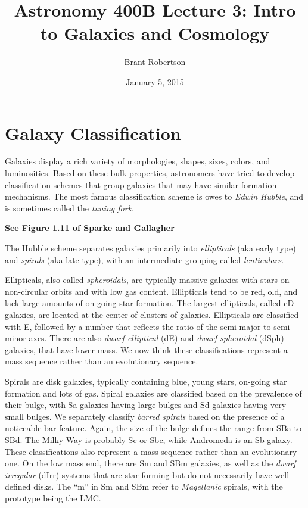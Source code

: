 \documentclass[]{article}
\title{Astronomy 400B Lecture 3: Intro to Galaxies and Cosmology}
\author{Brant Robertson}
\date{January 5, 2015}
\begin{document}
\maketitle

\section{Galaxy Classification}

Galaxies display a rich variety of morphologies, shapes, sizes, colors, and
luminosities. Based on these bulk properties, astronomers have tried to
develop classification schemes that group galaxies that may have similar
formation mechanisms. The most famous classification scheme is owes to 
{\it Edwin Hubble}, and is sometimes called the {\it tuning fork}.

{\bf See Figure 1.11 of Sparke and Gallagher}

The Hubble scheme separates galaxies primarily into {\it ellipticals}
(aka early type) and
{\it spirals} (aka late type), with an intermediate grouping
called {\it lenticulars}.

Ellipticals, also called {\it spheroidals}, are typically massive
galaxies with stars on non-circular orbits and with low gas content.
Ellipticals tend to be red, old, and lack large amounts of
on-going star formation.
The largest ellipticals, called cD galaxies, are located at the
center of clusters of galaxies. Ellipticals are classified with
E, followed by a number that reflects the ratio of the semi
major to semi minor axes.  There are also {\it dwarf elliptical}
(dE) and {\it dwarf spheroidal} (dSph) galaxies, that have lower
mass. We now think these classifications represent a mass sequence
rather than an evolutionary sequence.

Spirals are disk galaxies, typically containing blue, young stars,
on-going star formation and lots of gas.
Spiral galaxies are classified based on the prevalence of their
bulge, with Sa galaxies having large bulges and Sd galaxies having
very small bulges. We separately classify {\it barred spirals}
based on the presence of a noticeable bar feature.  Again, the
size of the bulge defines the range from SBa to SBd.  The Milky
Way is probably Sc or Sbc, while Andromeda is an Sb galaxy.
These classifications
also represent a mass sequence rather than an evolutionary one.
On the low mass end, there are Sm and SBm galaxies, as well as the
{\it dwarf irregular} (dIrr) systems that are star forming but
do not necessarily have well-defined disks. The ``m'' in Sm and
SBm refer to {\it Magellanic} spirals, with the prototype being
the LMC.
\end{document}
